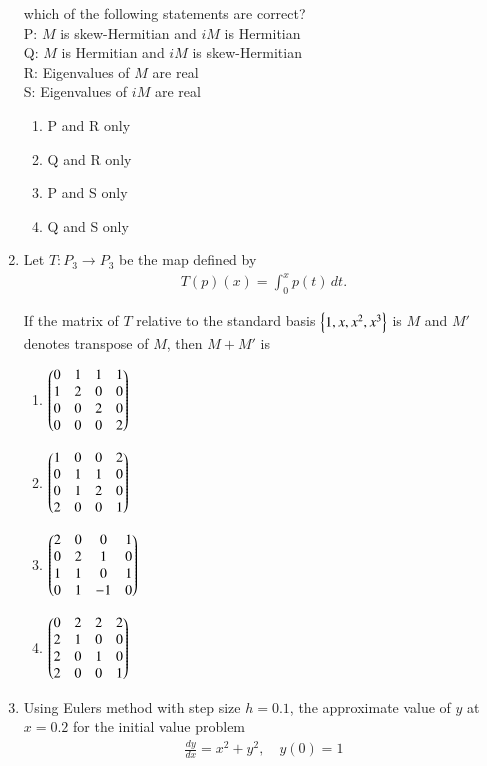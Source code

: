 \documentclass[journal]{IEEEtran}
\numberwithin{equation}{enumi}
\numberwithin{figure}{enumi}
\begin{document}
\begin{enumerate}
which of the following statements are correct?\\
P: $M$ is skew-Hermitian and $iM$ is Hermitian\\
Q: $M$ is Hermitian and $iM$ is skew-Hermitian\\
R: Eigenvalues of $M$ are real\\
S: Eigenvalues of $iM$ are real
\hfill{}
\begin{multicols}{2}
\begin{enumerate}
\item P and R only
\item Q and R only
\item P and S only
\item Q and S only
\end{enumerate}
\end{multicols}

\item
Let $T: P_3 \to P_3$ be the map defined by
\begin{align}
    T(p)(x) = \int_0^x p(t) \, dt.
\end{align}

If the matrix of $T$ relative to the standard basis $\left\{1, x, x^2, x^3\right\}$ is $M$ and $M'$ denotes transpose of $M$, then $M + M'$ is
\hfill{}
\begin{enumerate}
\item $\begin{pmatrix}
0 & 1 & 1 & 1 \\
1 & 2 & 0 & 0 \\
0 & 0 & 2 & 0 \\
0 & 0 & 0 & 2
\end{pmatrix}$
\item $\begin{pmatrix}
1 & 0 & 0 & 2 \\
0 & 1 & 1 & 0 \\
0 & 1 & 2 & 0 \\
2 & 0 & 0 & 1
\end{pmatrix}$
\item $\begin{pmatrix}
2 & 0 & 0 & 1 \\
0 & 2 & 1 & 0 \\
1 & 1 & 0 & 1 \\
0 & 1 & -1 & 0
\end{pmatrix}$
\item $\begin{pmatrix}
0 & 2 & 2 & 2 \\
2 & 1 & 0 & 0 \\
2 & 0 & 1 & 0 \\
2 & 0 & 0 & 1
\end{pmatrix}$
\end{enumerate}

\item
Using Eulers method with step size $h=0.1$, the approximate value of $y$ at $x=0.2$ for the initial value problem
\begin{align}
    \frac{dy}{dx} = x^2 + y^2, \quad y(0) = 1
\end{align}


\end{enumerate}
\end{document}
